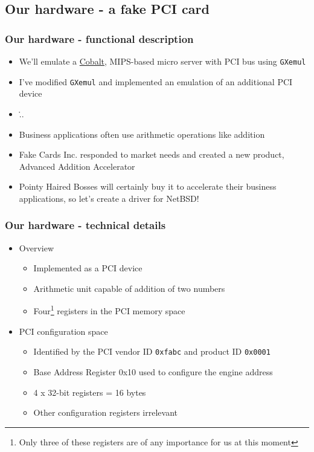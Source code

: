 \documentclass[dvipsnames,table]{beamer}
\begin{document}
\subsection{Our hardware - a fake PCI card}

\begin{frame}
\frametitle{Our hardware - functional description}
\begin{itemize}
	\item We'll emulate a \href{http://en.wikipedia.org/wiki/Cobalt_Qube}{Cobalt}, MIPS-based micro server with PCI bus using {\tt GXemul}
	\item I've modified {\tt GXemul} and implemented an emulation of an additional PCI device
	\item \...
	\item Business applications often use arithmetic operations like addition
	\item Fake Cards Inc. responded to market needs and created a new product, Advanced Addition Accelerator
	\item Pointy Haired Bosses will certainly buy it to accelerate their business applications, so let's create a driver for NetBSD!
\end{itemize}
\end{frame}

\begin{frame}
\frametitle{Our hardware - technical details}
\begin{itemize}
\item Overview
\begin{itemize}
	\item Implemented as a PCI device
	\item Arithmetic unit capable of addition of two numbers
	\item Four\footnote{Only three of these registers are of any importance for us at this moment} registers in the PCI memory space
\end{itemize}
\item PCI configuration space
\begin{itemize}
	\item Identified by the PCI vendor ID {\tt 0xfabc} and product ID {\tt 0x0001}
	\item Base Address Register 0x10 used to configure the engine address 
	\item 4 x 32-bit registers = 16 bytes
	\item Other configuration registers irrelevant
\end{itemize}
\end{itemize}
\end{frame}
\end{document}
